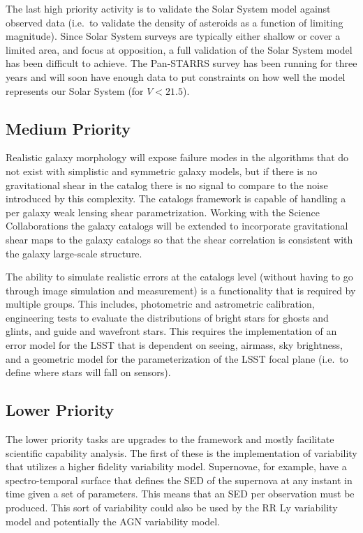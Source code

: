\documentclass[11pt]{article}
\begin{document}
The last high priority activity is to validate the Solar System model
against observed data (i.e.\ to validate the density of asteroids as a
function of limiting magnitude).  Since Solar System surveys are
typically either shallow or cover a limited area, and focus at
opposition, a full validation of the Solar System model has been
difficult to achieve.  The Pan-STARRS survey has been running for
three years and will soon have enough data to put constraints on how
well the \citet{grav11} model represents our Solar System (for
$V<21.5$).


\subsection{Medium Priority}


Realistic galaxy morphology will expose failure modes in the
algorithms that do not exist with simplistic and symmetric galaxy
models, but if there is no gravitational shear in the catalog there is
no signal to compare to the noise introduced by this complexity.  The
catalogs framework is capable of handling a per galaxy weak lensing
shear parametrization.  Working with the Science Collaborations the
galaxy catalogs will be extended to incorporate gravitational shear maps
to the galaxy catalogs so that the shear correlation is consistent
with the galaxy large-scale structure.

The ability to simulate realistic errors at the catalogs level
(without having to go through image simulation and measurement) is a
functionality that is required by multiple groups.  This includes,
photometric and astrometric calibration, engineering tests to evaluate
the distributions of bright stars for ghosts and glints, and guide and
wavefront stars. This requires the implementation of an error model
for the LSST that is dependent on seeing, airmass, sky brightness, and
a geometric model for the parameterization of the LSST focal plane
(i.e.\ to define where stars will fall on sensors).


\subsection{Lower Priority}

The lower priority tasks are upgrades to the framework and mostly
facilitate scientific capability analysis.  The first of these is the
implementation of variability that utilizes a higher fidelity
variability model.  Supernovae, for example, have a spectro-temporal
surface that defines the SED of the supernova at any instant in time
given a set of parameters.  This means that an SED per observation
must be produced.  This sort of variability could also be used by the
RR Ly variability model and potentially the AGN variability model.
\end{document}
